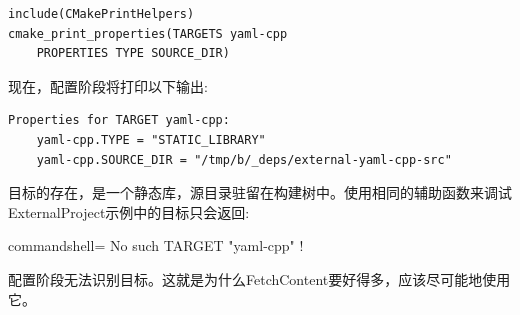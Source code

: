 \begin{lstlisting}[style=styleCMake]
include(CMakePrintHelpers)
cmake_print_properties(TARGETS yaml-cpp
	PROPERTIES TYPE SOURCE_DIR)
\end{lstlisting} 

现在，配置阶段将打印以下输出:

\begin{lstlisting}[style=styleCMake]
Properties for TARGET yaml-cpp:
	yaml-cpp.TYPE = "STATIC_LIBRARY"
	yaml-cpp.SOURCE_DIR = "/tmp/b/_deps/external-yaml-cpp-src"
\end{lstlisting} 

目标的存在，是一个静态库，源目录驻留在构建树中。使用相同的辅助函数来调试ExternalProject示例中的目标只会返回:

\begin{tcblisting}{commandshell={}}
No such TARGET "yaml-cpp" !
\end{tcblisting}

配置阶段无法识别目标。这就是为什么FetchContent要好得多，应该尽可能地使用它。




